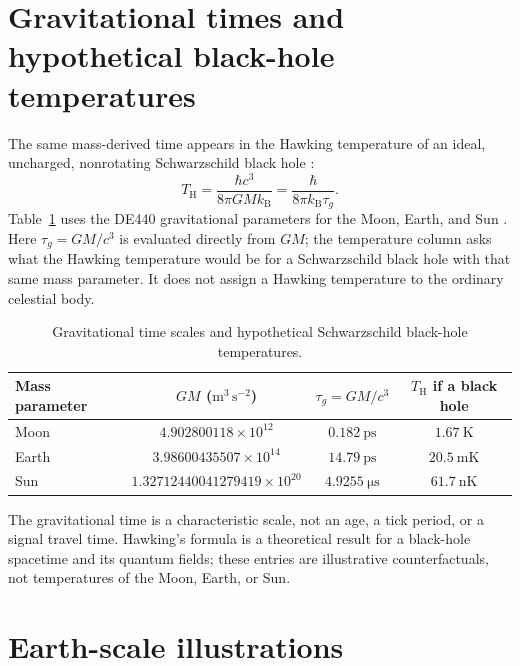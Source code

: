 \documentclass[12pt]{article}
\begin{document}
\section{Gravitational times and hypothetical black-hole temperatures}

The same mass-derived time appears in the Hawking temperature of an ideal, uncharged, nonrotating Schwarzschild black hole \cite{Hawking1975}:
\begin{equation}
  T_{\mathrm{H}}
  =\frac{\hbar c^3}{8\pi G M k_{\mathrm{B}}}
  =\frac{\hbar}{8\pi k_{\mathrm{B}}\tau_g}.
  \label{eq:hawking-temperature}
\end{equation}
Table~\ref{tab:mass-times} uses the DE440 gravitational parameters for the Moon, Earth, and Sun \cite{Park2021}. Here $\tau_g=GM/c^3$ is evaluated directly from $GM$; the temperature column asks what the Hawking temperature would be for a Schwarzschild black hole with that same mass parameter. It does not assign a Hawking temperature to the ordinary celestial body.

\begin{table}[ht]
  \centering
  \caption{Gravitational time scales and hypothetical Schwarzschild black-hole temperatures.}
  \label{tab:mass-times}
  \begin{tabular}{lccc}
    \toprule
    Mass parameter & $GM$ ($\mathrm{m^3\,s^{-2}}$) & $\tau_g=GM/c^3$ & $T_{\mathrm{H}}$ if a black hole \\
    \midrule
    Moon & $4.902800118\times10^{12}$ & $0.182\ \mathrm{ps}$ & $1.67\ \mathrm{K}$ \\
    Earth & $3.98600435507\times10^{14}$ & $14.79\ \mathrm{ps}$ & $20.5\ \mathrm{mK}$ \\
    Sun & $1.32712440041279419\times10^{20}$ & $4.9255\ \mathrm{\mu s}$ & $61.7\ \mathrm{nK}$ \\
    \bottomrule
  \end{tabular}
\end{table}

The gravitational time is a characteristic scale, not an age, a tick period, or a signal travel time. Hawking's formula is a theoretical result for a black-hole spacetime and its quantum fields; these entries are illustrative counterfactuals, not temperatures of the Moon, Earth, or Sun.

\section{Earth-scale illustrations}
\end{document}
